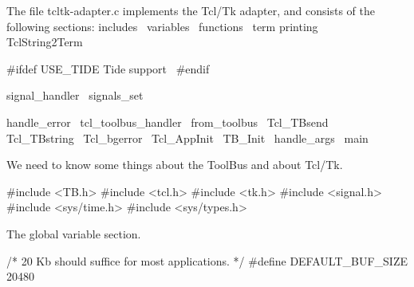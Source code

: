 

The file tcltk-adapter.c implements the Tcl/Tk adapter, and consists
of the following sections:
\endmoddef\let\nwnotused=\nwoutput{}
\LA{}includes~{\nwtagstyle{}}\RA{}
\LA{}variables~{\nwtagstyle{}}\RA{}
\LA{}functions~{\nwtagstyle{}}\RA{}
\LA{}term printing~{\nwtagstyle{}}\RA{}
\LA{}TclString2Term~{\nwtagstyle{}}\RA{}

#ifdef USE_TIDE
\LA{}Tide support~{\nwtagstyle{}}\RA{}
#endif

\LA{}signal_handler~{\nwtagstyle{}}\RA{}
\LA{}signals_set~{\nwtagstyle{}}\RA{}

\LA{}handle_error~{\nwtagstyle{}}\RA{}
\LA{}tcl_toolbus_handler~{\nwtagstyle{}}\RA{}
\LA{}from_toolbus~{\nwtagstyle{}}\RA{}
\LA{}Tcl_TBsend~{\nwtagstyle{}}\RA{}
\LA{}Tcl_TBstring~{\nwtagstyle{}}\RA{}
\LA{}Tcl_bgerror~{\nwtagstyle{}}\RA{}
\LA{}Tcl_AppInit~{\nwtagstyle{}}\RA{}
\LA{}TB_Init~{\nwtagstyle{}}\RA{}
\LA{}handle_args~{\nwtagstyle{}}\RA{}
\LA{}main~{\nwtagstyle{}}\RA{}
\nwnotused{tcltk-adapter.c*}\nwendcode{}\nwdocspar



We need to know some things about the ToolBus and about Tcl/Tk.

\nwenddocs{}\endmoddef\let\nwnotused=\nwoutput{}
#include <TB.h>
#include <tcl.h>
#include <tk.h>
#include <signal.h>
#include <sys/time.h>
#include <sys/types.h>
\nwendcode{}\nwdocspar


The global variable section.

\nwenddocs{}\endmoddef\let\nwnotused=\nwoutput{}
/* 20 Kb should suffice for most applications. */
#define DEFAULT_BUF_SIZE        20480

